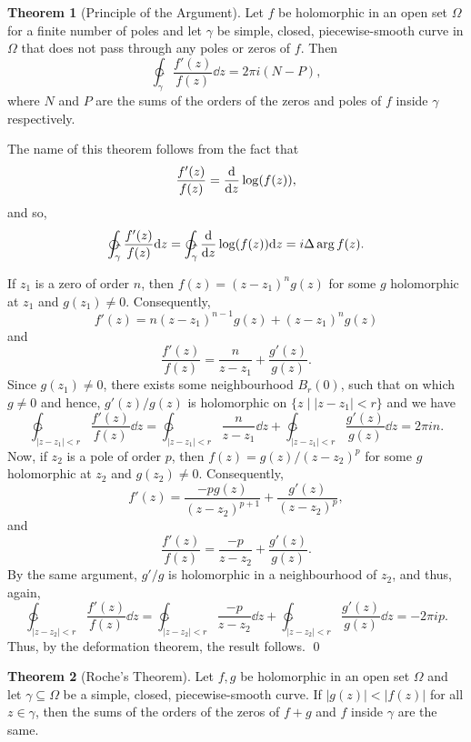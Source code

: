 \documentclass[
]{article}
\theoremstyle{definition}
\newtheorem{theorem}{Theorem}
\theoremstyle{definition}
\begin{document}
\begin{theorem}[Principle of the Argument]
  Let \(f\) be holomorphic in an open set \(\Omega\) for a finite number of poles 
  and let \(\gamma\) be simple, closed, piecewise-smooth curve in \(\Omega\) 
  that does not pass through any poles or zeros of \(f\). Then 
  \[\ointctrclockwise_\gamma \frac{f'(z)}{f(z)} \dd z = 2 \pi i (N - P),\]
  where \(N\) and \(P\) are the sums of the orders of the zeros and poles of 
  \(f\) inside \(\gamma\) respectively.
\end{theorem}

The name of this theorem follows from the fact that
\[\frac{f'(z)}{f(z)} = \dv{z} \log(f(z)),\] and so,
\[\ointctrclockwise_\gamma \frac{f'(z)}{f(z)} \dd z = 
  \ointctrclockwise_\gamma \dv{z} \log(f(z)) \dd z = i\Delta \arg f(z).\]

\proof

If \(z_1\) is a zero of order \(n\), then \(f(z) = (z - z_1)^n g(z)\)
for some \(g\) holomorphic at \(z_1\) and \(g(z_1) \neq 0\).
Consequently, \[f'(z) = n(z - z_1)^{n - 1}g(z) + (z - z_1)^n g(z)\] and
\[\frac{f'(z)}{f(z)} = \frac{n}{z - z_1} + \frac{g'(z)}{g(z)}.\] Since
\(g(z_1) \neq 0\), there exists some neighbourhood \(B_r(0)\), such that
on which \(g \neq 0\) and hence, \(g'(z) / g(z)\) is holomorphic on
\(\{z \mid |z - z_1| < r\}\) and we have
\[\ointctrclockwise_{|z -z_1| < r}\frac{f'(z)}{f(z)} \dd z 
    = \ointctrclockwise_{|z -z_1| < r}\frac{n}{z - z_1} \dd z + 
      \ointctrclockwise_{|z -z_1| < r}\frac{g'(z)}{g(z)} \dd z = 2\pi i n.\]
Now, if \(z_2\) is a pole of order \(p\), then
\(f(z) = g(z) / (z - z_2)^p\) for some \(g\) holomorphic at \(z_2\) and
\(g(z_2) \neq 0\). Consequently,
\[f'(z) = \frac{-pg(z)}{(z - z_2)^{p + 1}} + \frac{g'(z)}{(z - z_2)^p},\]
and \[\frac{f'(z)}{f(z)} = \frac{-p}{z - z_2} + \frac{g'(z)}{g(z)}.\] By
the same argument, \(g' / g\) is holomorphic in a neighbourhood of
\(z_2\), and thus, again,
\[\ointctrclockwise_{|z -z_2| < r}\frac{f'(z)}{f(z)} \dd z 
    = \ointctrclockwise_{|z -z_2| < r}\frac{-p}{z - z_2} \dd z + 
      \ointctrclockwise_{|z -z_2| < r}\frac{g'(z)}{g(z)} \dd z = - 2\pi i p.\]
Thus, by the deformation theorem, the result follows. \qed

\begin{theorem}[Roche's Theorem]
  Let \(f, g\) be holomorphic in an open set \(\Omega\) and let \(\gamma \subseteq \Omega\) 
  be a simple, closed, piecewise-smooth curve. If \(|g(z)| < |f(z)|\) for all 
  \(z \in \gamma\), then the sums of the orders of the zeros of \(f + g\) and 
  \(f\) inside \(\gamma\) are the same.
\end{theorem}
\proof
\end{document}
